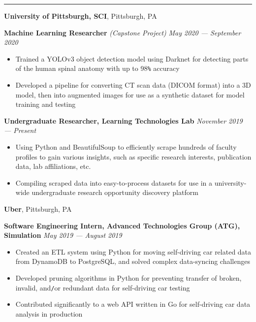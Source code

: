 \documentclass[10pt]{article}
\begin{document}
\begin{flushleft}
		\hrule

		\vspace{2.25mm}
		\textbf{University of Pittsburgh, SCI}, Pittsburgh, PA\\
		\begin{leftli}
         {\small \textbf{Machine Learning Researcher} \textit{(Capstone Project)}}  \hfill \textit{\small May 2020 --- September 2020}
			\begin{itemize}
				\item Trained a YOLOv3 object detection model using Darknet for detecting parts of the human spinal anatomy with up to 98\verb!%! accuracy
				\vspace{-2mm}
				\item Developed a pipeline for converting CT scan data (DICOM format) into a 3D model, then into augmented images for use as a synthetic dataset for model training and testing
			\end{itemize}
		\end{leftli}

		\begin{leftli}
			{\small \textbf{Undergraduate Researcher, Learning Technologies Lab}} \hfill \textit{\small November 2019 --- Present}
			\begin{itemize}
				\item Using Python and BeautifulSoup to efficiently scrape hundreds of faculty profiles to gain various insights, such as specific research interests, publication data, lab affiliations, etc.
				\vspace{-2mm}
				\item Compiling scraped data into easy-to-process datasets for use in a university-wide undergraduate research opportunity discovery platform
			\end{itemize}
		\end{leftli}

		\vspace{-1.50mm}
		\textbf{Uber}, Pittsburgh, PA\\
		\begin{leftli}
			{\small \textbf{Software Engineering Intern, Advanced Technologies Group (ATG), Simulation}} \hfill \textit{\small May 2019 --- August 2019}
			\begin{itemize}
				\item Created an ETL system using Python for moving self-driving car related data from DynamoDB to PostgreSQL, and solved complex data-syncing challenges
				\vspace{-2mm}
				\item Developed pruning algorithms in Python for preventing transfer of broken, invalid, and\texttt{/}or redundant data for self-driving car testing
				\vspace{-2mm}
				\item Contributed significantly to a web API written in Go for self-driving car data analysis in production
			\end{itemize}
		\end{leftli}


\end{flushleft}
\end{document}
